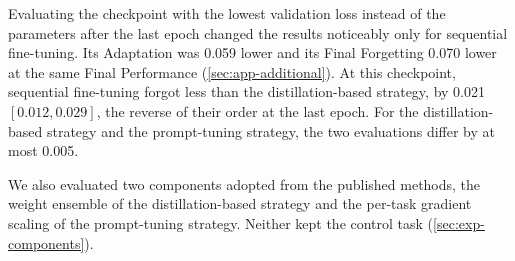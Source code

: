 Evaluating the checkpoint with the lowest validation loss instead of the parameters after the last epoch changed the results noticeably only for sequential fine-tuning.
Its Adaptation was 0.059 lower and its Final Forgetting 0.070 lower at the same Final Performance (\cref{sec:app-additional}).
At this checkpoint, sequential fine-tuning forgot less than the distillation-based strategy, by 0.021 $[0.012, 0.029]$, the reverse of their order at the last epoch.
For the distillation-based strategy and the prompt-tuning strategy, the two evaluations differ by at most 0.005.

We also evaluated two components adopted from the published methods, the weight ensemble of the distillation-based strategy and the per-task gradient scaling of the prompt-tuning strategy.
Neither kept the control task (\cref{sec:exp-components}).


